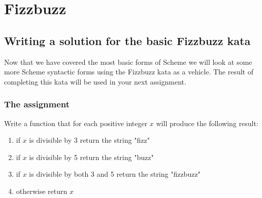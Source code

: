 \documentclass[12pt,a4paper,english,twoside]{article}
\begin{document}
\section{Fizzbuzz}
\subsection{Writing a solution for the basic Fizzbuzz kata}
Now that we have covered the most basic forms of Scheme we will look at some 
more Scheme syntactic forms using the Fizzbuzz kata as a vehicle. The result 
of completing this kata will be used in your next assignment.
\subsubsection{The assignment}
Write a function that for each positive integer $x$ will produce the following 
result:
\begin{enumerate}
  \item if $x$ is divisible by 3 return the string "fizz"
  \item if $x$ is divisible by 5 return the string "buzz"
  \item if $x$ is divisible by both 3 and 5 return the string "fizzbuzz"
  \item otherwise return $x$
\end{enumerate}
\end{document}
